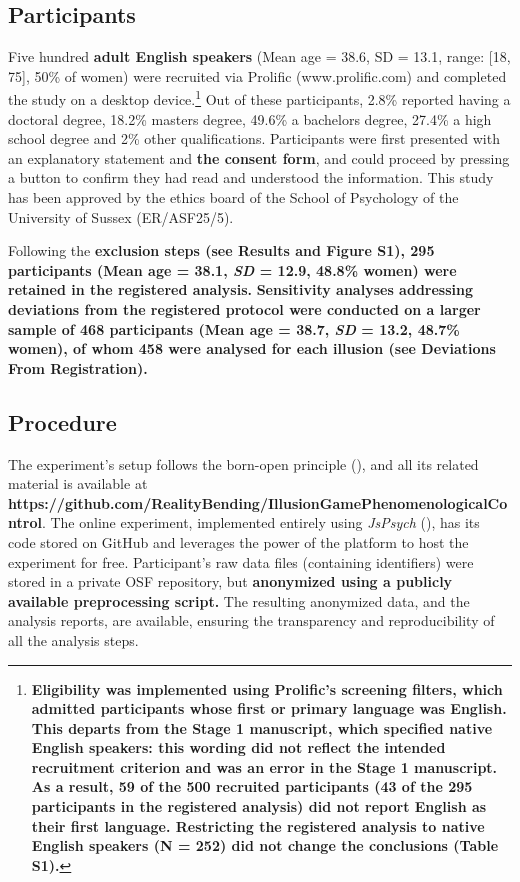 \documentclass[
  man,
  floatsintext,
  longtable,
  nolmodern,
  notxfonts,
  notimes,
  colorlinks=true,linkcolor=blue,citecolor=blue,urlcolor=blue]{apa7}
\begin{document}
\subsection{Participants}\label{participants}

Five hundred \textbf{adult English speakers} (Mean age = 38.6, SD =
13.1, range: {[}18, 75{]}, 50\% of women) were recruited via Prolific
(www.prolific.com) and completed the study on a desktop
device.\footnote{\textbf{Eligibility was implemented using Prolific's
  screening filters, which admitted participants whose first or primary
  language was English. This departs from the Stage 1 manuscript, which
  specified native English speakers: this wording did not reflect the
  intended recruitment criterion and was an error in the Stage 1
  manuscript. As a result, 59 of the 500 recruited participants (43 of
  the 295 participants in the registered analysis) did not report
  English as their first language. Restricting the registered analysis
  to native English speakers (N = 252) did not change the conclusions
  (Table S1).}} Out of these participants, 2.8\% reported having a
doctoral degree, 18.2\% masters degree, 49.6\% a bachelors degree,
27.4\% a high school degree and 2\% other qualifications. Participants
were first presented with an explanatory statement and \textbf{the
consent form}, and could proceed by pressing a button to confirm they
had read and understood the information. This study has been approved by
the ethics board of the School of Psychology of the University of Sussex
(ER/ASF25/5).

Following the \textbf{exclusion steps (see Results and Figure S1), 295
participants (Mean age = 38.1, \emph{SD} = 12.9, 48.8\% women) were
retained in the registered analysis.} \textbf{Sensitivity analyses
addressing deviations from the registered protocol were conducted on a
larger sample of 468 participants (Mean age = 38.7, \emph{SD} = 13.2,
48.7\% women), of whom 458 were analysed for each illusion (see
Deviations From Registration).}

\subsection{Procedure}\label{procedure}

The experiment's setup follows the born-open principle
(), and all its related
material is available at
\textbf{https://github.com/RealityBending/IllusionGamePhenomenologicalControl}.
The online experiment, implemented entirely using \emph{JsPsych}
(), has its code stored on
GitHub and leverages the power of the platform to host the experiment
for free. Participant's raw data files (containing identifiers) were
stored in a private OSF repository, but \textbf{anonymized using a
publicly available preprocessing script.} The resulting anonymized data,
and the analysis reports, are available, ensuring the transparency and
reproducibility of all the analysis steps.
\end{document}

